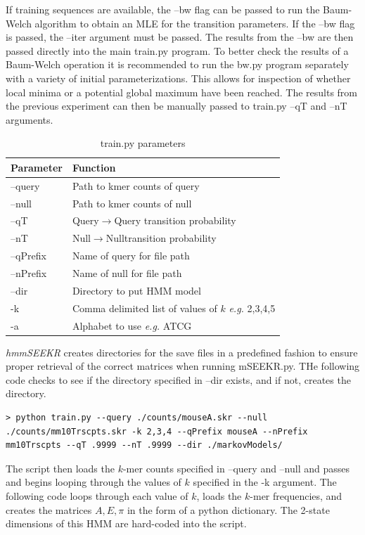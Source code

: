 If training sequences are available, the --bw flag can be passed to run the Baum-Welch algorithm to obtain an MLE for the transition parameters. If the --bw flag is passed, the --iter argument must be passed. The results from the --bw are then passed directly into the main train.py program. To better check the results of a Baum-Welch operation it is recommended to run the bw.py program separately with a variety of initial parameterizations. This allows for inspection of whether local minima or a potential global maximum have been reached. The results from the previous experiment can then be manually passed to train.py --qT and --nT arguments.
\begin{table}[h]
\centering
 \begin{tabular}{|l l|}
 \hline
 Parameter & Function\\
 \hline
 --query & Path to kmer counts of query \\
 --null & Path to kmer counts of null \\
 --qT & Query$\rightarrow$Query transition probability \\
 --nT & Null$\rightarrow$Nulltransition probability \\
 --qPrefix & Name of query for file path \\
 --nPrefix & Name of null for file path\\
 --dir & Directory to put HMM model \\
 -k & Comma delimited list of values of $k$ \emph{e.g.} 2,3,4,5\\
 -a & Alphabet to use \emph{e.g.} ATCG\\
 \hline
 
\end{tabular}
\caption{train.py parameters}
\label{tab:trainparams}
\end{table}
\linebreak

\emph{hmmSEEKR} creates directories for the save files in a predefined fashion to ensure proper retrieval of the correct matrices when running mSEEKR.py. THe following code checks to see if the directory specified in --dir exists, and if not, creates the directory. 

\begin{verbatim}
> python train.py --query ./counts/mouseA.skr --null ./counts/mm10Trscpts.skr -k 2,3,4 --qPrefix mouseA --nPrefix mm10Trscpts --qT .9999 --nT .9999 --dir ./markovModels/
\end{verbatim}

The script then loads the $k$-mer counts specified in --query and --null and passes and begins looping through the values of $k$ specified in the -k argument. The following code loops through each value of $k$, loads the $k$-mer frequencies, and creates the matrices $A,E,\pi$ in the form of a python dictionary. The 2-state dimensions of this HMM are hard-coded into the script. 


